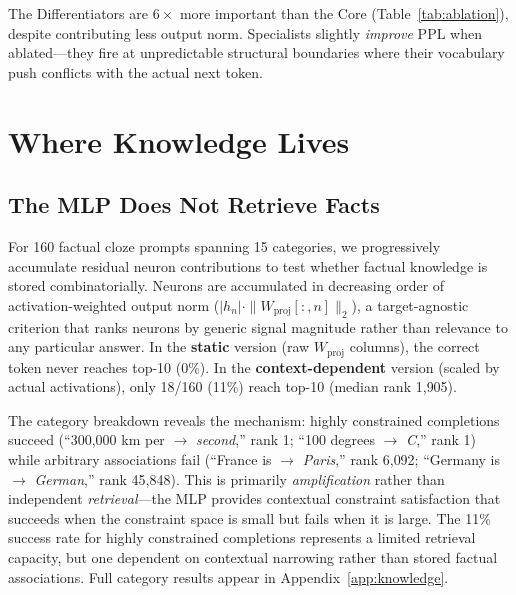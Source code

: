 \documentclass{article}
\begin{document}
The Differentiators are $6\times$ more important than the Core
(Table~\ref{tab:ablation}), despite contributing less output norm.
Specialists slightly \emph{improve} PPL when ablated---they fire at
unpredictable structural boundaries where their vocabulary push conflicts
with the actual next token.

\section{Where Knowledge Lives}
\label{sec:knowledge}

\subsection{The MLP Does Not Retrieve Facts}

For 160 factual cloze prompts spanning 15 categories, we progressively
accumulate residual neuron contributions to test whether factual knowledge
is stored combinatorially.
Neurons are accumulated in decreasing order of activation-weighted output
norm ($|h_n| \cdot \|W_\text{proj}[:, n]\|_2$), a target-agnostic criterion
that ranks neurons by generic signal magnitude rather than relevance to
any particular answer.
In the \textbf{static} version (raw $W_\text{proj}$ columns), the correct
token never reaches top-10 (0\%).
In the \textbf{context-dependent} version (scaled by actual activations),
only 18/160 (11\%) reach top-10 (median rank 1{,}905).

The category breakdown reveals the mechanism: highly constrained completions
succeed (``300{,}000 km per $\to$ \emph{second},'' rank 1; ``100 degrees $\to$
\emph{C},'' rank 1) while arbitrary associations fail (``France is $\to$
\emph{Paris},'' rank 6{,}092; ``Germany is $\to$ \emph{German},'' rank 45{,}848).
This is primarily \emph{amplification} rather than independent
\emph{retrieval}---the MLP provides contextual constraint satisfaction that
succeeds when the constraint space is small but fails when it is large.
The 11\% success rate for highly constrained completions represents a limited
retrieval capacity, but one dependent on contextual narrowing rather than
stored factual associations.
Full category results appear in Appendix~\ref{app:knowledge}.
\end{document}
